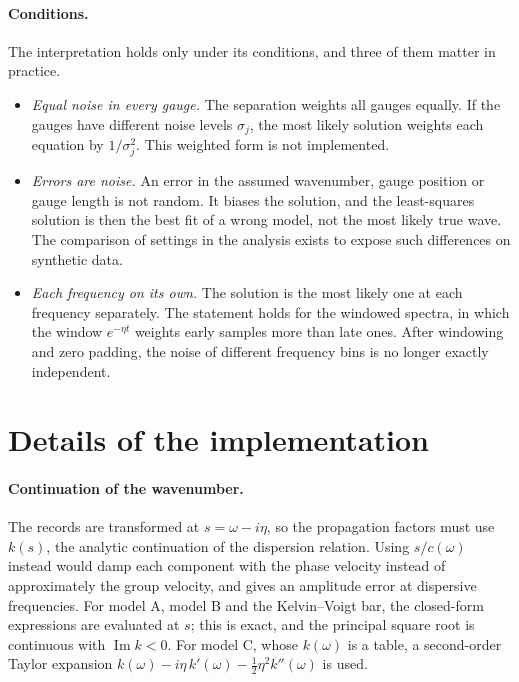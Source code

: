\documentclass[11pt,a4paper,numbers=noenddot,abstract=true]{scrartcl}
\DeclareMathOperator{\Imag}{Im}
\begin{document}
\paragraph{Conditions.} The interpretation holds only under its conditions, and three of them matter in practice.
\begin{itemize}
  \item \emph{Equal noise in every gauge.} The separation weights all gauges equally. If the gauges have different
  noise levels $\sigma_j$, the most likely solution weights each equation by $1 / \sigma_j^2$. This weighted form
  is not implemented.
  \item \emph{Errors are noise.} An error in the assumed wavenumber, gauge position or gauge length is not random.
  It biases the solution, and the least-squares solution is then the best fit of a wrong model, not the most likely
  true wave. The comparison of settings in the analysis exists to expose such differences on synthetic data.
  \item \emph{Each frequency on its own.} The solution is the most likely one at each frequency separately. The
  statement holds for the windowed spectra, in which the window $e^{-\eta t}$ weights early samples more than late
  ones. After windowing and zero padding, the noise of different frequency bins is no longer exactly independent.
\end{itemize}

\section{Details of the implementation}
\label{sec:implementation}

\paragraph{Continuation of the wavenumber.} The records are transformed at $s = \omega - i\eta$, so the propagation
factors must use $k(s)$, the analytic continuation of the dispersion relation. Using $s / c(\omega)$ instead would
damp each component with the phase velocity instead of approximately the group velocity, and gives an amplitude
error at dispersive frequencies. For model A, model B and the Kelvin--Voigt bar, the closed-form expressions are
evaluated at $s$; this is exact, and the principal square root is continuous with $\Imag k < 0$. For model C,
whose $k(\omega)$ is a table, a second-order Taylor expansion
$k(\omega) - i\eta\, k'(\omega) - \tfrac{1}{2}\eta^2 k''(\omega)$ is used.
\end{document}
